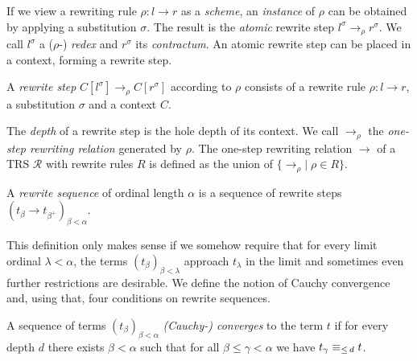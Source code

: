 If we view a rewriting rule $\rho : l \rightarrow r$ as a \emph{scheme}, an
\emph{instance} of $\rho$ can be obtained by applying a substitution
$\sigma$. The result is the \emph{atomic} rewrite step $l^\sigma
\rightarrow_\rho r^\sigma$. We call $l^\sigma$ a ($\rho$-) \emph{redex} and
$r^\sigma$ its \emph{contractum}. An atomic rewrite step can be placed in a
context, forming a rewrite step.

\begin{definition}%
A \emph{rewrite step} $C[l^\sigma] \rightarrow_\rho C[r^\sigma]$ according to
$\rho$ consists of a rewrite rule $\rho : l \rightarrow r$, a substitution
$\sigma$ and a context $C$.
\end{definition}

The \emph{depth} of a rewrite step is the hole depth of its context.
We call $\rightarrow_\rho$ the \emph{one-step rewriting relation} generated by
$\rho$. The one-step rewriting relation $\rightarrow$ of a TRS $\mathcal{R}$
with rewrite rules $R$ is defined as the union of $\{ \rightarrow_\rho | \;
\rho \in R \}$.

\begin{definition}%
A \emph{rewrite sequence} of ordinal length $\alpha$ is a sequence of rewrite
steps $(t_\beta \rightarrow t_{\beta^+})_{\beta < \alpha}$.
\end{definition}

This definition only makes sense if we somehow require that for every limit
ordinal $\lambda < \alpha$, the terms $(t_\beta)_{\beta < \lambda}$ approach
$t_\lambda$ in the limit and sometimes even further restrictions are
desirable. We define the notion of Cauchy convergence and, using that, four
conditions on rewrite sequences.

\begin{definition}\label{def:cauchy}%
  A sequence of terms $(t_\beta)_{\beta < \alpha}$ \emph{(Cauchy-) converges}
  to the term $t$ if for every depth $d$ there exists $\beta < \alpha$ such
  that for all $\beta \le \gamma < \alpha$ we have $t_\gamma \equiv_{\le \, d} t$.
\end{definition}

